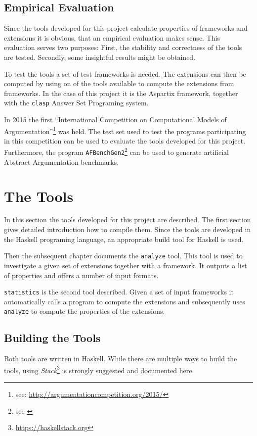 \documentclass[parskip=half]{scrartcl}
\begin{document}
\subsection{Empirical Evaluation}
Since the tools developed for this project calculate properties of
frameworks and extensions it is obvious, that an empirical evaluation
makes sense. This evaluation serves two purposes: First, the stability
and correctness of the tools are tested. Secondly, some insightful
results might be obtained.

To test the tools a set of test frameworks is needed. The extensions
can then be computed by using on of the tools available to compute
the extensions from frameworks. In the case of this project it is
the Aspartix framework, together with the \texttt{clasp} Answer Set
Programing system.

In 2015 the first ``International Competition on Computational
Models of Argumentation''\footnote{see:
\url{http://argumentationcompetition.org/2015/}} was held. The
test set used to test the programs participating in this competition
can be used to evaluate the tools developed for this project. Furthermore,
the program \texttt{AFBenchGen2}\footnote{see \cite{afbenchgen2}} can be
 used to generate artificial Abstract Argumentation benchmarks.

\section{The Tools}
\label{tools}
In this section the tools developed for this project are described. The
first section gives detailed introduction how to compile them. Since the tools
are developed in the Haskell programing language, an  appropriate
build tool for Haskell is used.

Then the subsequent chapter documents the \texttt{analyze} tool. This tool is
used to investigate a given set of extensions together with a framework. It outputs
a list of properties and offers a number of input formats.

\texttt{statistics} is the second tool described. Given a set of input
frameworks it automatically calls a program to compute the extensions and
subsequently uses \texttt{analyze} to compute the properties of the extensions.

\subsection{Building the Tools}
Both tools are written in Haskell. While there are multiple ways to build the
tools, using \emph{Stack}\footnote{\url{https://haskellstack.org}}
is strongly suggested and documented here.
\end{document}

